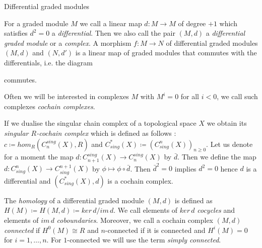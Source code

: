 \begin{Definition}{Differential graded modules}

For a graded module $M$ we call a linear map $d \colon M \to M$ of degree $+1$ which satisfies $ d^2 = 0$ a \emph{differential}.
Then we also call the pair $(M , d)$ a \emph{differential graded module} or a \emph{complex}.
A morphism $f \colon M \to N$ of differential graded modules $(M,d)$ and $(N,d')$ is a linear map of graded modules that commutes with the 
differentials, i.e. the diagram \\

\centerline{
}
commutes.
\end{Definition}

Often we will be interested in complexes $M$ with $M^i = 0$ for all $i < 0$, we call such complexes \emph{cochain complexes}.

\begin{Example}
 If we dualise the singular chain complex of a topological space $X$ we obtain its \emph{singular $R$-cochain complex} which 
 is defined as follows : \newline
 $c \coloneqq hom_R(C_n^{sing}(X),R)$ and $C^*_{sing}(X) \coloneqq (C^n_{sing}(X))_{n \geq 0}$. \newline
 Let us denote for a moment the map $d \colon C_{n+1}^{sing}(X) \to C_n^{sing}(X)$ by $\bar{d}$. Then we define the map
 $d \colon C_{sing}^n(X) \to C_{sing}^{n+1}(X)$ by $\phi \mapsto \phi \circ \bar{d}$. Then $\bar{d}^2 = 0$ implies $d^2 = 0$
 hence $d$ is a differential and $(C^*_{sing}(X),d)$ is a cochain complex.
\end{Example}

\begin{Definition}
The \emph{homology} of a differential graded module $(M,d)$ is defined as \newline ${H(M) \coloneqq 
H(M,d) \coloneqq ker \, d / im \, d}$.
We call elements of $ker \, d$ \emph{cocycles} and elements of $im \, d$ \emph{coboundaries}.
Moreover, we call a cochain complex $(M,d)$ \emph{connected} if $H^0(M) \cong R$ and $n$-connected if 
it is connected and $H^i(M) = 0$ for $i = 1, \dotsc, n$. For $1$-connected we will use the term \emph{simply connected}.
\end{Definition}


